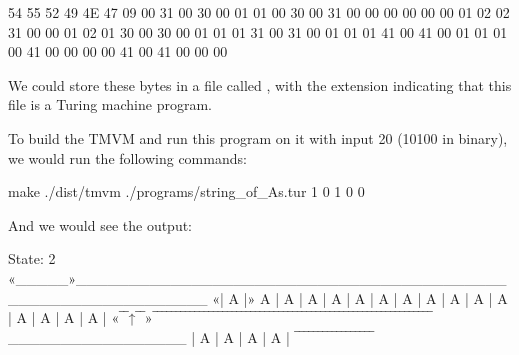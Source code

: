 \begin{stdout}
54 55 52 49 4E 47 09 00 31 00 30 00 01 01 00 30 00 31 00 00 00 00 00 00 01 02 02 31 00 00 01 02 01 30 00 30 00 01 01 01 31 00 31 00 01 01 01 41 00 41 00 01 01 01 00 41 00 00 00 00 41 00 41 00 00 00
\end{stdout}

We could store these bytes in a file called , with the  extension indicating that this file is a Turing machine program.

To build the TMVM and run this program on it with input 20 (10100 in binary), we would run the following commands:

\begin{stdout}
make
./dist/tmvm ./programs/string_of_As.tur 1 0 1 0 0
\end{stdout}

And we would see the output:

\begin{stdout}
State: 2
«_____»____________________________________________________________
«| A |» A | A | A | A | A | A | A | A | A | A | A | A | A | A | A |
«‾‾↑‾‾»‾‾‾‾‾‾‾‾‾‾‾‾‾‾‾‾‾‾‾‾‾‾‾‾‾‾‾‾‾‾‾‾‾‾‾‾‾‾‾‾‾‾‾‾‾‾‾‾‾‾‾‾‾‾‾‾‾‾‾‾
_________________
| A | A | A | A |
‾‾‾‾‾‾‾‾‾‾‾‾‾‾‾‾‾
\end{stdout}